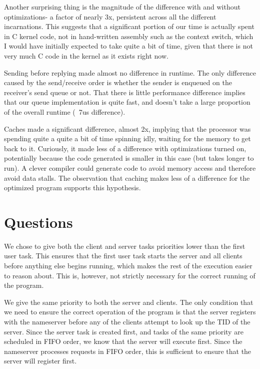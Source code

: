 \documentclass[titlepage]{article}
\begin{document}
Another surprising thing is the magnitude of the difference with and without
optimizations- a factor of nearly 3x, persistent across all the different
incarnations. This suggests that a significant portion of our time is actually
spent in C kernel code, not in hand-written assembly such as the context switch,
which I would have initially expected to take quite a bit of time, given that
there is not very much C code in the kernel as it exists right now.

Sending before replying made almost no difference in runtime.
The only difference caused by the send/receive order is whether the sender is
enqueued on the receiver's send queue or not.
That there is little performance difference implies that our queue
implementation is quite fast, and doesn't take a large proportion of the overall
runtime (~7us difference).

Caches made a significant difference, almost 2x, implying that the processor was
spending quite a quite a bit of time spinning idly, waiting for the memory to
get back to it. Curiously, it made less of a difference with optimizations
turned on, potentially because the code generated is smaller in this case (but
takes longer to run).
A clever compiler could generate code to avoid memory access and therefore
avoid data stalls.
The observation that caching makes less of a difference for the optimized program
supports this hypothesis.

\section{Questions}
We chose to give both the client and server tasks priorities lower than
the first user task.
This ensures that the first user task starts the server and all clients
before anything else begins running, which makes the rest of the execution
easier to reason about.
This is, however, not strictly necessary for the correct running of the program.

We give the same priority to both the server and clients.
The only condition that we need to ensure the correct operation of the program
is that the server registers with the nameserver before
any of the clients attempt to look up the TID of the server.
Since the server task is created first, and tasks of the same priority are scheduled in FIFO order,
we know that the server will execute first.
Since the nameserver processes requests in FIFO order, this is sufficient to
ensure that the server will register first.
\end{document}
